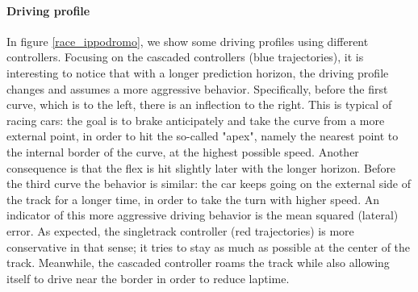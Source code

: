 \documentclass[a4paper, onecolumn, 11pt]{article}
\begin{document}
\paragraph{Driving profile}
In figure \ref{race_ippodromo}, we show some driving profiles using different
controllers. Focusing on the cascaded controllers (blue trajectories), it is
interesting to notice that with a longer prediction horizon, the driving profile
changes and assumes a more aggressive behavior. Specifically, before the first
curve, which is to the left, there is an inflection to the right. This is
typical of racing cars: the goal is to brake anticipately and take the curve
from a more external point, in order to hit the so-called "apex", namely the
nearest point to the internal border of the curve, at the highest possible
speed. Another consequence is that the flex is hit slightly later with the
longer horizon. Before the third curve the behavior is similar: the car keeps
going on the external side of the track for a longer time, in order to take the
turn with higher speed. An indicator of this more aggressive driving behavior is
the mean squared (lateral) error. As expected, the singletrack controller (red
trajectories) is more conservative in that sense; it tries to stay as much as
possible at the center of the track. Meanwhile, the cascaded controller roams
the track while also allowing itself to drive near the border in order to reduce
laptime.
\end{document}
